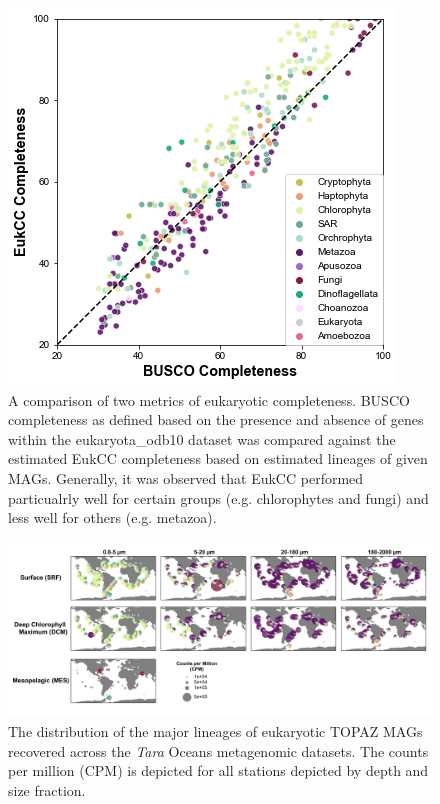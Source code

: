 \documentclass[12pt]{article}
\numberwithin{equation}{section}
\begin{document}
\begin{figure}
    \centering
    \includegraphics[width=0.8\columnwidth]{si-figures/HQ_BUSCO-EukCC-comp.png}
    \caption{A comparison of two metrics of eukaryotic completeness. BUSCO completeness as defined based on the presence and absence of genes within the eukaryota\_odb10 dataset was compared against the estimated EukCC completeness based on estimated lineages of given MAGs. Generally, it was observed that EukCC performed particualrly well for certain groups (e.g. chlorophytes and fungi) and less well for others (e.g. metazoa).}
    \label{fig:eukcc}
\end{figure}


\begin{landscape}
\begin{figure}
    \centering
    \includegraphics[width=0.95\columnwidth]{si-figures/Distribution-Map-Taxonomy-01.png}
    \caption{The distribution of the major lineages of eukaryotic TOPAZ MAGs recovered across the \textit{Tara} Oceans metagenomic datasets. The counts per million (CPM) is depicted for all stations depicted by depth and size fraction.  }
    \label{fig:map}
\end{figure}
\end{landscape}
\end{document}
